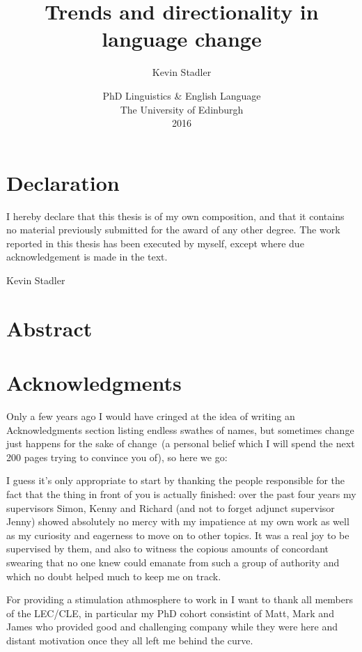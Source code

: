 \documentclass[oneside]{book}
\author{Kevin Stadler}
\title{Trends and directionality in language change}
\date{%
\vfill PhD Linguistics \& English Language\\
The University of Edinburgh\\
2016}
\begin{document}
\frontmatter

\maketitle

\chapter*{Declaration}
I hereby declare that this thesis is of my own composition, and that it contains no material previously submitted for the award of any other degree. The work reported in this thesis has been executed by myself, except where due
acknowledgement is made in the text.

\vspace{1in}\hfill Kevin Stadler

\chapter*{Abstract}


\chapter*{Acknowledgments}

Only a few years ago I would have cringed at the idea of writing an Acknowledgments section listing endless swathes of names, but sometimes change just happens for the sake of change~(a personal belief which I will spend the next 200 pages trying to convince you of), so here we go:

I guess it's only appropriate to start by thanking the people responsible for the fact that the thing in front of you is actually finished: over the past four years my supervisors Simon, Kenny and Richard (and not to forget adjunct supervisor Jenny) showed absolutely no mercy with my impatience at my own work as well as my curiosity and eagerness to move on to other topics. It was a real joy to be supervised by them, and also to witness the copious amounts of concordant swearing that no one knew could emanate from such a group of authority and which no doubt helped much to keep me on track.

For providing a stimulation athmosphere to work in I want to thank all members of the LEC/CLE, in particular my PhD cohort consistint of Matt, Mark and James who provided good and challenging company while they were here and distant motivation once they all left me behind the curve.
\end{document}
